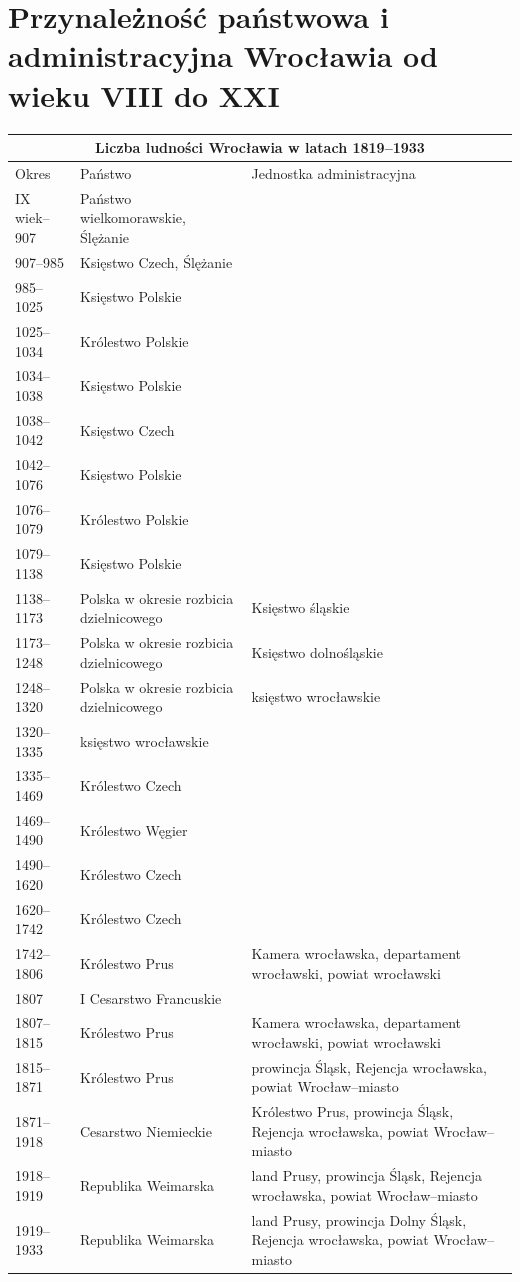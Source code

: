 \documentclass{article}
\begin{document}
\section{Przynależność państwowa i administracyjna Wrocławia od wieku VIII do XXI}
\begin{tabular}{ |p{2cm}|p{5cm}|p{5cm}| }
 \hline
 \multicolumn{3}{|c|}{Liczba ludności Wrocławia w latach 1819–1933} \\
 \hline
 Okres & Państwo & Jednostka administracyjna\\
 \hline
IX wiek–907 & Państwo wielkomorawskie, Ślężanie & \\
\hline
907–985 & Księstwo Czech, Ślężanie &\\
\hline
985–1025 & Księstwo Polskie &\\
\hline
1025–1034 & Królestwo Polskie &\\
\hline
1034–1038 & Księstwo Polskie &\\
\hline
1038–1042 & Księstwo Czech &\\
\hline
1042–1076 & Księstwo Polskie &\\
\hline
1076–1079 & Królestwo Polskie &\\
\hline
1079–1138 & Księstwo Polskie & \\
\hline
1138–1173 & Polska w okresie rozbicia dzielnicowego & Księstwo śląskie\\
\hline
1173–1248 & Polska w okresie rozbicia dzielnicowego & Księstwo dolnośląskie\\
\hline
1248–1320 & Polska w okresie rozbicia dzielnicowego & księstwo wrocławskie\\
\hline
1320–1335 & księstwo wrocławskie &\\
\hline 
1335–1469 & Królestwo Czech &\\
\hline
1469–1490 & Królestwo Węgier &\\
\hline
1490–1620 & Królestwo Czech &\\
\hline
1620–1742 & Królestwo Czech &\\
\hline
1742–1806 & Królestwo Prus & Kamera wrocławska, departament wrocławski, powiat wrocławski\\
\hline
1807 & I Cesarstwo Francuskie &\\
\hline
1807–1815 & Królestwo Prus & Kamera wrocławska, departament wrocławski, powiat wrocławski\\
\hline
1815–1871 & Królestwo Prus & prowincja Śląsk, Rejencja wrocławska, powiat Wrocław–miasto\\
\hline 
1871–1918 & Cesarstwo Niemieckie & Królestwo Prus, prowincja Śląsk, Rejencja wrocławska, powiat Wrocław–miasto\\
\hline
1918–1919 & Republika Weimarska & land Prusy, prowincja Śląsk, Rejencja wrocławska, powiat Wrocław–miasto\\
\hline 
1919–1933 & Republika Weimarska & land Prusy, prowincja Dolny Śląsk, Rejencja wrocławska, powiat Wrocław–miasto\\
\hline
\end{tabular}
\end{document}
